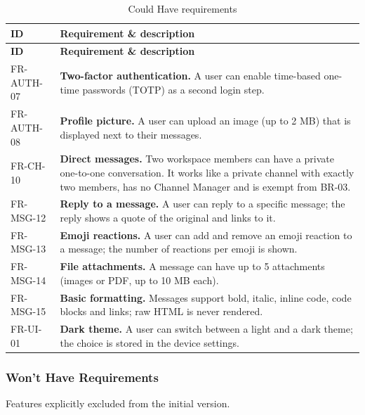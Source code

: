 \documentclass[
    english, %
]{VUMIFPSkursinis}
\newcommand{\frhead}{\textbf{ID} & \textbf{Requirement \& description} \\ \hline}
\begin{document}
\begin{longtable}{|p{}|p{}|}
\caption{Could Have requirements}\\ \hline
\frhead
\endfirsthead
\hline \frhead
\endhead
FR-AUTH-07 & \textbf{Two-factor authentication.} A user can enable time-based one-time passwords (TOTP) as a second login step. \\ \hline
FR-AUTH-08 & \textbf{Profile picture.} A user can upload an image (up to 2 MB) that is displayed next to their messages. \\ \hline
FR-CH-10 & \textbf{Direct messages.} Two workspace members can have a private one-to-one conversation. It works like a private channel with exactly two members, has no Channel Manager and is exempt from BR-03. \\ \hline
FR-MSG-12 & \textbf{Reply to a message.} A user can reply to a specific message; the reply shows a quote of the original and links to it. \\ \hline
FR-MSG-13 & \textbf{Emoji reactions.} A user can add and remove an emoji reaction to a message; the number of reactions per emoji is shown. \\ \hline
FR-MSG-14 & \textbf{File attachments.} A message can have up to 5 attachments (images or PDF, up to 10 MB each). \\ \hline
FR-MSG-15 & \textbf{Basic formatting.} Messages support bold, italic, inline code, code blocks and links; raw HTML is never rendered. \\ \hline
FR-UI-01 & \textbf{Dark theme.} A user can switch between a light and a dark theme; the choice is stored in the device settings. \\ \hline

\end{longtable}

\subsubsection{Won't Have Requirements}
Features explicitly excluded from the initial version.
\end{document}

